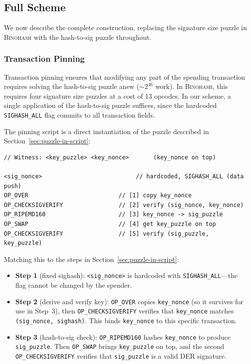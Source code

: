 \documentclass[11pt, a4paper]{article}
\begin{document}
\subsection{Full Scheme}
\label{sec:full-scheme}

We now describe the complete construction, replacing the signature size puzzle in \textsc{Binohash} with the hash-to-sig puzzle throughout.

\subsubsection{Transaction Pinning}
\label{sec:qs-pinning}

Transaction pinning ensures that modifying any part of the spending transaction requires solving the hash-to-sig puzzle anew (${\sim}2^{46}$ work). In \textsc{Binohash}, this requires four signature size puzzles at a cost of 13 opcodes. In our scheme, a single application of the hash-to-sig puzzle suffices, since the hardcoded \texttt{SIGHASH\_ALL} flag commits to all transaction fields.

The pinning script is a direct instantiation of the puzzle described in Section~\ref{sec:puzzle-in-script}:

\begin{lstlisting}[language={}, numbers=none]
// Witness: <key_puzzle> <key_nonce>       (key_nonce on top)

<sig_nonce>                           // hardcoded, SIGHASH_ALL (data push)
OP_OVER                          // [1] copy key_nonce
OP_CHECKSIGVERIFY                // [2] verify (sig_nonce, key_nonce)
OP_RIPEMD160                     // [3] key_nonce -> sig_puzzle
OP_SWAP                          // [4] get key_puzzle on top
OP_CHECKSIGVERIFY                // [5] verify (sig_puzzle, key_puzzle)
\end{lstlisting}

\noindent Matching this to the steps in Section~\ref{sec:puzzle-in-script}:

\begin{itemize}
    \item \textbf{Step 1} (fixed sighash): \texttt{<sig\_nonce>} is hardcoded with \texttt{SIGHASH\_ALL}---the flag cannot be changed by the spender.

    \item \textbf{Step 2} (derive and verify key): \texttt{OP\_OVER} copies \texttt{key\_nonce} (so it survives for use in Step~3), then \texttt{OP\_CHECKSIGVERIFY} verifies that \texttt{key\_nonce} matches \texttt{(sig\_nonce, sighash)}. This binds \texttt{key\_nonce} to this specific transaction.

    \item \textbf{Step 3} (hash-to-sig check): \texttt{OP\_RIPEMD160} hashes \texttt{key\_nonce} to produce \texttt{sig\_puzzle}. Then \texttt{OP\_SWAP} brings \texttt{key\_puzzle} on top, and the second \texttt{OP\_CHECKSIGVERIFY} verifies that \texttt{sig\_puzzle} is a valid DER signature.
\end{itemize}
\end{document}
